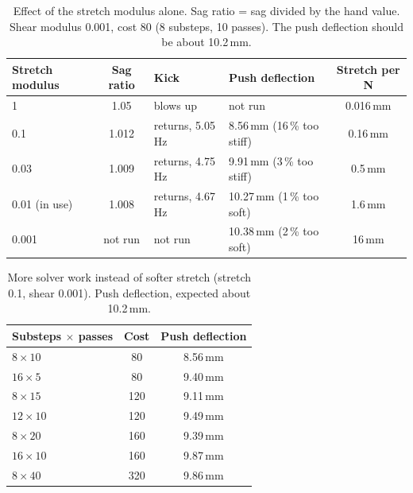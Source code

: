 \begin{table}[h]
  \centering
  \caption{Effect of the stretch modulus alone. Sag ratio = sag divided by the hand value. Shear modulus 0.001, cost 80 (8 substeps, 10 passes).
           The push deflection should be about 10.2\,mm.}
  \label{tab:stem-stretch}
  \begin{tabular}{lcllc}
    \toprule
    Stretch modulus & Sag ratio & Kick & Push deflection & Stretch per N \\
    \midrule
    1               & 1.05    & blows up          & not run                     & 0.016\,mm \\
    0.1             & 1.012   & returns, 5.05\,Hz & 8.56\,mm (16\,\% too stiff) & 0.16\,mm  \\
    0.03            & 1.009   & returns, 4.75\,Hz & 9.91\,mm (3\,\% too stiff)  & 0.5\,mm   \\
    0.01 (in use)   & 1.008   & returns, 4.67\,Hz & 10.27\,mm (1\,\% too soft)  & 1.6\,mm   \\
    0.001           & not run & not run           & 10.38\,mm (2\,\% too soft)  & 16\,mm    \\
    \bottomrule
  \end{tabular}
\end{table}

\begin{table}[h]
  \centering
  \caption{More solver work instead of softer stretch (stretch 0.1, shear 0.001). Push deflection,
           expected about 10.2\,mm.}
  \label{tab:stem-solver-work}
  \begin{tabular}{lcc}
    \toprule
    Substeps $\times$ passes & Cost & Push deflection \\
    \midrule
    $8 \times 10$  & 80  & 8.56\,mm \\
    $16 \times 5$  & 80  & 9.40\,mm \\
    $8 \times 15$  & 120 & 9.11\,mm \\
    $12 \times 10$ & 120 & 9.49\,mm \\
    $8 \times 20$  & 160 & 9.39\,mm \\
    $16 \times 10$ & 160 & 9.87\,mm \\
    $8 \times 40$  & 320 & 9.86\,mm \\
    \bottomrule
  \end{tabular}
\end{table}


